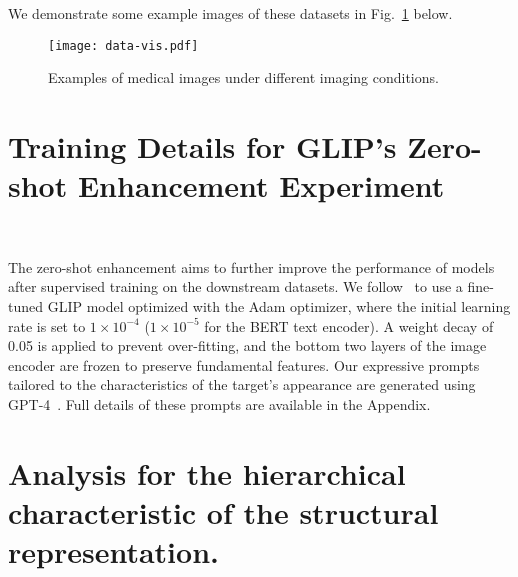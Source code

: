 We demonstrate some example images of these datasets in Fig.~\ref{fig:data-vis} below. 

\begin{figure}[ht]
  \centering
  \texttt{[image: data-vis.pdf]}
  \caption{Examples of medical images under different imaging conditions.}
  \label{fig:data-vis}
\end{figure}

\section{Training Details for GLIP's Zero-shot Enhancement Experiment}~\label{app:training_details}

 The zero-shot enhancement aims to further improve the performance of models after supervised training on the downstream datasets. We follow~\cite{qin2023medical} to use a fine-tuned GLIP model optimized with the Adam optimizer\cite{adam}, where the initial learning rate is set to $1 \times 10^{-4}$ ($1 \times 10^{-5}$ for the BERT text encoder). A weight decay of 0.05 is applied to prevent over-fitting, and the bottom two layers of the image encoder are frozen to preserve fundamental features. Our expressive prompts tailored to the characteristics of the target's appearance are generated using GPT-4~\cite{achiam2023gpt}. Full details of these prompts are available in the Appendix.







\section{Analysis for the hierarchical characteristic of the structural representation.}
\label{app:structural-representation-analysis}

